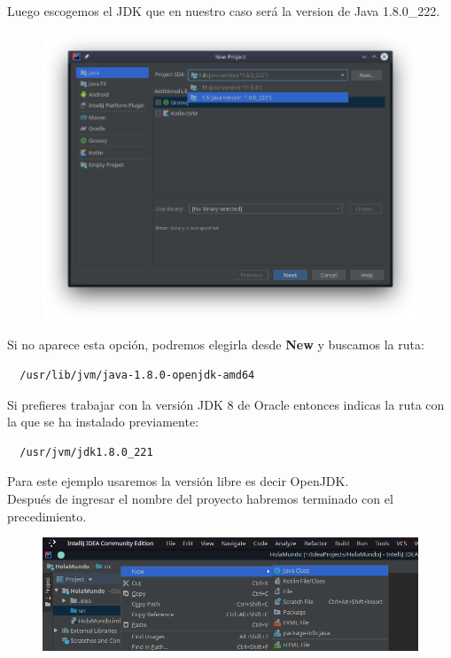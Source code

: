 \documentclass{article}
\begin{document}
Luego escogemos el JDK que en nuestro caso será la version de Java 1.8.0\_222.

\begin{figure}[h!]
  \centering
  \includegraphics[scale=0.75]{./Pictures/001_escoger_jdk.png}
\end{figure}

Si no aparece esta opción, podremos elegirla desde \textbf{New} y buscamos la ruta:\\

\begin{verbatim}
  /usr/lib/jvm/java-1.8.0-openjdk-amd64
\end{verbatim}

Si prefieres trabajar con la versión JDK 8 de Oracle entonces indicas la ruta
con la que se ha instalado previamente:\\

\begin{verbatim}
  /usr/jvm/jdk1.8.0_221
\end{verbatim}

Para este ejemplo usaremos la versión libre es decir OpenJDK.\\

Después de ingresar el nombre del proyecto habremos terminado con el
precedimiento.\\

\begin{figure}[h!]
  \centering
  \includegraphics[scale=0.75]{./Pictures/033_crear_clase.png}
\end{figure}
\end{document}
